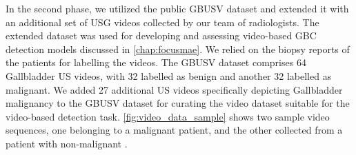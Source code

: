% 
In the second phase, we utilized the public GBUSV dataset and extended it with an additional set of USG videos collected by our team of radiologists. The extended dataset was used for developing and assessing video-based GBC detection models discussed in \cref{chap:focusmae}. We relied on the biopsy reports of the patients for labelling the videos. The GBUSV dataset comprises 64 Gallbladder US videos, with 32 labelled as benign and another 32 labelled as malignant. We added 27 additional US videos specifically depicting Gallbladder malignancy to the GBUSV dataset for curating the video dataset suitable for the video-based \gbc detection task. 
\cref{fig:video_data_sample} shows two sample video sequences, one belonging to a malignant patient, and the other collected from a patient with non-malignant \gb.


